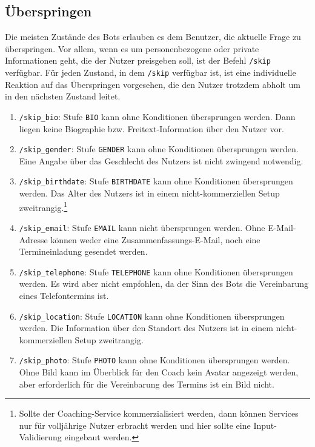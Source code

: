         \subsection{Überspringen} \label{Realisierung: skip}
            Die meisten Zustände des Bots erlauben es dem Benutzer, die aktuelle Frage zu überspringen. Vor allem, wenn es um personenbezogene oder private Informationen geht, die der Nutzer preisgeben soll, ist der Befehl \verb|/skip| verfügbar. Für jeden Zustand, in dem \verb|/skip| verfügbar ist, ist eine individuelle Reaktion auf das Überspringen vorgesehen, die den Nutzer trotzdem abholt um in den nächsten Zustand leitet. 
            \begin{enumerate}
                \item \verb|/skip_bio|: Stufe \verb|BIO| kann ohne Konditionen übersprungen werden. Dann liegen keine Biographie bzw. Freitext-Information über den Nutzer vor.
                \item \verb|/skip_gender|: Stufe \verb|GENDER| kann ohne Konditionen übersprungen werden. Eine Angabe über das Geschlecht des Nutzers ist nicht zwingend notwendig.
                \item \verb|/skip_birthdate|: Stufe \verb|BIRTHDATE| kann ohne Konditionen übersprungen werden. Das Alter des Nutzers ist in einem nicht-kommerziellen Setup zweitrangig.\footnote{Sollte der Coaching-Service kommerzialisiert werden, dann können Services nur für volljährige Nutzer erbracht werden und hier sollte eine Input-Validierung eingebaut werden.}
                \item \verb|/skip_email|: Stufe \verb|EMAIL| kann nicht übersprungen werden. Ohne E-Mail-Adresse können weder eine Zusammenfassungs-E-Mail, noch eine Termineinladung gesendet werden.
                \item \verb|/skip_telephone|: Stufe \verb|TELEPHONE| kann ohne Konditionen übersprungen werden. Es wird aber nicht empfohlen, da der Sinn des Bots die Vereinbarung eines Telefontermins ist.
                \item \verb|/skip_location|: Stufe \verb|LOCATION| kann ohne Konditionen übersprungen werden. Die Information über den Standort des Nutzers ist in einem nicht-kommerziellen Setup zweitrangig. 
                \item \verb|/skip_photo|: Stufe \verb|PHOTO| kann ohne Konditionen übersprungen werden. Ohne Bild kann im Überblick für den Coach kein Avatar angezeigt werden, aber erforderlich für die Vereinbarung des Termins ist ein Bild nicht.
            \end{enumerate}
            
